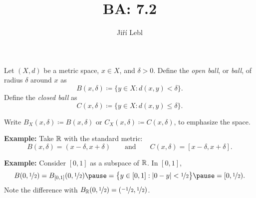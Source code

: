 \documentclass[10pt,aspectratio=169]{beamer}
\author{Ji\v{r}\'i Lebl}
\institute[OSU]{%
Departemento pri Matematiko de Oklahoma {\^S}tata Universitato}
\title{BA: 7.2}
\date{}
\begin{document}
\begin{frame}
\titlepage
\end{frame}

\begin{frame}
\begin{definition}
Let $(X,d)$ be a metric space, $x \in X$, and $\delta > 0$.
\pause
Define
the \emph{open ball}, or \emph{ball}, of radius $\delta$
around $x$ as
\begin{equation*}
B(x,\delta) \coloneqq \bigl\{ y \in X : d(x,y) < \delta \bigr\} .
\end{equation*}
\pause
Define the \emph{closed ball} as
\begin{equation*}
C(x,\delta) \coloneqq \bigl\{ y \in X : d(x,y) \leq \delta \bigr\} .
\end{equation*}
\end{definition}
\pause

Write $B_X(x,\delta) \coloneqq B(x,\delta)$ or $C_X(x,\delta) \coloneqq C(x,\delta)$,
to emphasize the space.

\pause
\medskip

\textbf{Example:}
Take ${\mathbb{R}}$ with the standard metric:
\[
B(x,\delta) = (x-\delta,x+\delta) \qquad \text{and} \qquad
C(x,\delta) = [x-\delta,x+\delta] .
\]

\pause
\medskip

\textbf{Example:}
Consider $[0,1]$ as a subspace of ${\mathbb{R}}$.
In $[0,1]$,
\[
B(0,\nicefrac{1}{2}) = B_{[0,1]}(0,\nicefrac{1}{2})
\pause
= \bigl\{ y \in [0,1] : \abs{0-y} < \nicefrac{1}{2} \bigr\}
\pause
= [0,\nicefrac{1}{2}) .
\]
\pause
Note the difference with $B_{{\mathbb{R}}}(0,\nicefrac{1}{2}) =
(\nicefrac{-1}{2},\nicefrac{1}{2})$.

\end{frame}
\end{document}
